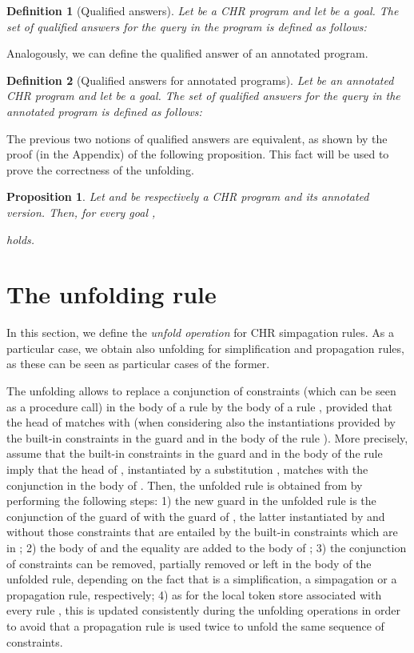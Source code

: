 \documentclass{tlp}
\newtheorem{definition}{Definition} \newtheorem{proposition}{Proposition} \newtheorem{example}{Example} \newtheorem{corollary}{Corollary} \newtheorem{theorem}{Theorem} \newtheorem{lemma}{Lemma}
\begin{document}
\begin{definition}[{\sc Qualified answers}]  Let  be a CHR program and let
 be a goal. The set  of
qualified answers for the query  in the program  is defined
as follows:

\end{definition}

Analogously, we can define the qualified answer of an annotated
program.

\begin{definition}[{\sc Qualified answers for annotated programs}]
Let  be an annotated CHR program and let  be a goal. The set  of qualified answers
for the query  in the annotated program  is defined as follows:

\end{definition}


The previous two notions of qualified answers are equivalent,
as shown by the proof (in the Appendix) of the following proposition.
This fact will be used to prove the correctness of the unfolding.

\begin{proposition}\label{prop:nequality}
Let  and  be respectively a CHR program and its annotated version.
Then, for every goal ,

holds.
\end{proposition}

\section{The unfolding rule}\label{sec:unfolding}


In this section, we define the \emph{unfold operation} for CHR
simpagation rules. As a particular case, we obtain also
unfolding for  simplification and propagation rules, as these can
be seen as particular cases of the former.

The unfolding allows to replace  a  conjunction  of constraints
(which can be seen as a procedure call) in the body of a rule 
by the body of a rule  ,  provided that the head of  matches
with  (when considering also the instantiations provided by the built-in constraints in
the guard and in the body of the rule ). More precisely, assume that
the built-in constraints in the guard and in the body
of the rule  imply that the head  of ,
instantiated by a substitution , matches with the
conjunction  in the body of  . Then, the unfolded rule is
obtained from  by performing the following steps:  1) the new
guard in the unfolded rule is the conjunction of the guard of 
with the guard of , the latter instantiated by  and
without  those constraints that are entailed by the built-in
constraints which are in
; 2) the body of  and the equality
 are added to the body of ; 3) the conjunction of constraints  can
be removed, partially removed or left in the body of  the unfolded
rule, depending on the fact that  is a simplification, a
simpagation or a propagation rule, respectively; 4) as for the
local token store   associated with every rule , this is
updated consistently during the unfolding operations in order to
avoid that a propagation rule is used twice to unfold the same
sequence of constraints.
\end{document}
